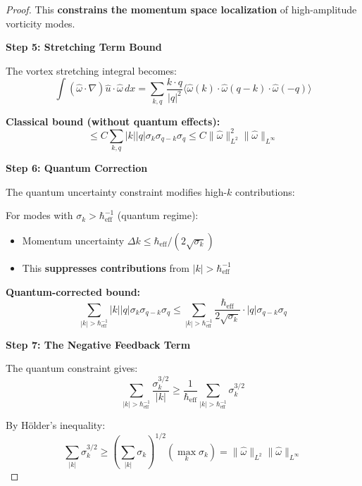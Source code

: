 \documentclass[11pt,a4paper]{article}
\theoremstyle{definition}
\theoremstyle{remark}
\newcommand{\heff}{\hbar_{\text{eff}}}
\newcommand{\omegahat}{\hat{\omega}}
\newcommand{\uhat}{\hat{u}}
\newcommand{\norm}[1]{\|#1\|}
\newcommand{\avg}[1]{\langle #1 \rangle}
\begin{document}
\begin{proof}
This \textbf{constrains the momentum space localization} of high-amplitude vorticity modes.

\textbf{Step 5: Stretching Term Bound}

The vortex stretching integral becomes:
\begin{equation}
\int (\omegahat \cdot \nabla)\uhat \cdot \omegahat \, dx = \sum_{k,q} \frac{k \cdot q}{|q|^2} \avg{\omegahat(k) \cdot \omegahat(q-k) \cdot \omegahat(-q)}
\label{eq:stretching_integral}
\end{equation}

\textbf{Classical bound (without quantum effects):}
\begin{equation}
\leq C \sum_{k,q} |k||q| \sigma_k \sigma_{q-k} \sigma_q \leq C\norm{\omegahat}_{L^2}^2 \norm{\omegahat}_{L^\infty}
\label{eq:classical_bound}
\end{equation}

\textbf{Step 6: Quantum Correction}

The quantum uncertainty constraint modifies high-$k$ contributions:

For modes with $\sigma_k > \heff^{-1}$ (quantum regime):
\begin{itemize}
    \item Momentum uncertainty $\Delta k \leq \heff/(2\sqrt{\sigma_k})$
    \item This \textbf{suppresses contributions} from $|k| > \heff^{-1}$
\end{itemize}

\textbf{Quantum-corrected bound:}
\begin{equation}
\sum_{|k|>\heff^{-1}} |k||q| \sigma_k \sigma_{q-k} \sigma_q \leq \sum_{|k|>\heff^{-1}} \frac{\heff}{2\sqrt{\sigma_k}} \cdot |q| \sigma_{q-k} \sigma_q
\label{eq:quantum_correction}
\end{equation}

\textbf{Step 7: The Negative Feedback Term}

The quantum constraint gives:
\begin{equation}
\sum_{|k|>\heff^{-1}} \frac{\sigma_k^{3/2}}{|k|} \geq \frac{1}{\heff} \sum_{|k|>\heff^{-1}} \sigma_k^{3/2}
\label{eq:negative_prep}
\end{equation}

By Hölder's inequality:
\begin{equation}
\sum_{|k|} \sigma_k^{3/2} \geq \left(\sum_{|k|} \sigma_k\right)^{1/2} \left(\max_k \sigma_k\right) = \norm{\omegahat}_{L^2} \norm{\omegahat}_{L^\infty}
\label{eq:holder}
\end{equation}


\end{proof}
\end{document}
